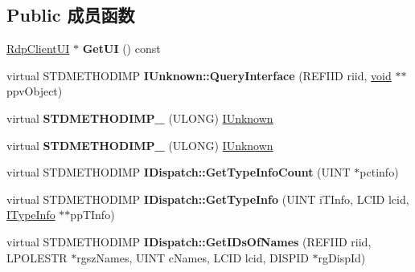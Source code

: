 \subsection*{Public 成员函数}
\begin{DoxyCompactItemize}
\item 
\mbox{\label{class_s_e_a_l_e_d___a8585f30998eca1bcf0dc3fefd246fbae}} 
\hyperlink{class_rdp_client_u_i}{Rdp\+Client\+UI} $\ast$ {\bfseries Get\+UI} () const
\item 
\mbox{\label{class_s_e_a_l_e_d___a302aa056517e404a6c1c212d50ac256d}} 
virtual S\+T\+D\+M\+E\+T\+H\+O\+D\+I\+MP {\bfseries I\+Unknown\+::\+Query\+Interface} (R\+E\+F\+I\+ID riid, \hyperlink{interfacevoid}{void} $\ast$$\ast$ppv\+Object)
\item 
\mbox{\label{class_s_e_a_l_e_d___a5ed85c5eed8c256dcacbcf5c7afa5bc2}} 
virtual {\bfseries S\+T\+D\+M\+E\+T\+H\+O\+D\+I\+M\+P\+\_\+} (U\+L\+O\+NG) \hyperlink{interface_i_unknown}{I\+Unknown}
\item 
\mbox{\label{class_s_e_a_l_e_d___a5ed85c5eed8c256dcacbcf5c7afa5bc2}} 
virtual {\bfseries S\+T\+D\+M\+E\+T\+H\+O\+D\+I\+M\+P\+\_\+} (U\+L\+O\+NG) \hyperlink{interface_i_unknown}{I\+Unknown}
\item 
\mbox{\label{class_s_e_a_l_e_d___a43e341e7d3dba1dd27d48ba268990185}} 
virtual S\+T\+D\+M\+E\+T\+H\+O\+D\+I\+MP {\bfseries I\+Dispatch\+::\+Get\+Type\+Info\+Count} (U\+I\+NT $\ast$pctinfo)
\item 
\mbox{\label{class_s_e_a_l_e_d___acbf00a27c984067aa3b59ecad301a606}} 
virtual S\+T\+D\+M\+E\+T\+H\+O\+D\+I\+MP {\bfseries I\+Dispatch\+::\+Get\+Type\+Info} (U\+I\+NT i\+T\+Info, L\+C\+ID lcid, \hyperlink{interface_i_type_info}{I\+Type\+Info} $\ast$$\ast$pp\+T\+Info)
\item 
\mbox{\label{class_s_e_a_l_e_d___ab5380e57e1c03deb49d1f77a7fb4d185}} 
virtual S\+T\+D\+M\+E\+T\+H\+O\+D\+I\+MP {\bfseries I\+Dispatch\+::\+Get\+I\+Ds\+Of\+Names} (R\+E\+F\+I\+ID riid, L\+P\+O\+L\+E\+S\+TR $\ast$rgsz\+Names, U\+I\+NT c\+Names, L\+C\+ID lcid, D\+I\+S\+P\+ID $\ast$rg\+Disp\+Id)
\item 

\end{DoxyCompactItemize}
